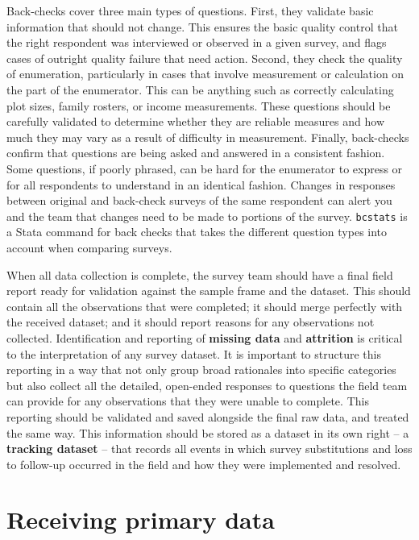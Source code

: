 Back-checks cover three main types of questions.
First, they validate basic information that should not change.
This ensures the basic quality control that the right respondent
was interviewed or observed in a given survey,
and flags cases of outright quality failure that need action.
Second, they check the quality of enumeration,
particularly in cases that involve measurement or calculation
on the part of the enumerator.
This can be anything such as correctly calculating plot sizes,
family rosters, or income measurements.
These questions should be carefully validated
to determine whether they are reliable measures
and how much they may vary as a result of difficulty in measurement.
Finally, back-checks confirm that questions are being asked and answered
in a consistent fashion. Some questions, if poorly phrased,
can be hard for the enumerator to express or for all respondents
to understand in an identical fashion.
Changes in responses between original and back-check surveys
of the same respondent
can alert you and the team that changes need to be made
to portions of the survey.
\texttt{bcstats} is a Stata command for back checks
that takes the different question types into account when comparing surveys.

When all data collection is complete,
the survey team should have a final field report
ready for validation against the sample frame and the dataset.
This should contain all the observations that were completed;
it should merge perfectly with the received dataset;
and it should report reasons for any observations not collected.
Identification and reporting of \textbf{missing data} and \textbf{attrition} is critical
to the interpretation of any survey dataset.
It is important to structure this reporting in a way that
not only group broad rationales into specific categories
but also collect all the detailed, open-ended responses to questions the field team can provide
for any observations that they were unable to complete.
This reporting should be validated and saved
alongside the final raw data, and treated the same way.
This information should be stored as a dataset in its own right
-- a \textbf{tracking dataset} --
that records all events in which survey substitutions
and loss to follow-up occurred in the field
and how they were implemented and resolved.


\section{Receiving primary data}

